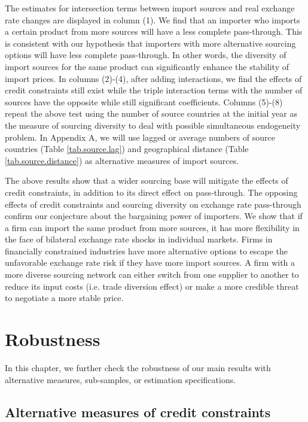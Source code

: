 \documentclass[12pt]{article}
\begin{document}
The estimates for intersection terms between import sources and real exchange rate changes are displayed in column (1). We find that an importer who imports a certain product from more sources will have a less complete pass-through. This is consistent with our hypothesis that importers with more alternative sourcing options will have less complete pass-through. In other words, the diversity of import sources for the same product can significantly enhance the stability of import prices. In columns (2)-(4), after adding interactions, we find the effects of credit constraints still exist while the triple interaction terms with the number of sources have the opposite while still significant coefficients. Columns (5)-(8) repeat the above test using the number of source countries at the initial year as the measure of sourcing diversity to deal with possible simultaneous endogeneity problem. In Appendix A, we will use lagged or average numbers of source countries (Table \ref{tab.source.lag}) and geographical distance (Table \ref{tab.source.distance}) as alternative measures of import sources.

The above results show that a wider sourcing base will mitigate the effects of credit constraints, in addition to its direct effect on pass-through. The opposing effects of credit constraints and sourcing diversity on exchange rate pass-through confirm our conjecture about the bargaining power of importers. We show that if a firm can import the same product from more sources, it has more flexibility in the face of bilateral exchange rate shocks in individual markets. Firms in financially constrained industries have more alternative options to escape the unfavorable exchange rate risk if they have more import sources. A firm with a more diverse sourcing network can either switch from one supplier to another to reduce its input costs (i.e. trade diversion effect) or make a more credible threat to negotiate a more stable price.

\section{Robustness} \label{Robustness}

In this chapter, we further check the robustness of our main results with alternative measures,  sub-samples, or estimation specifications.

\subsection{Alternative measures of credit constraints}
\end{document}
